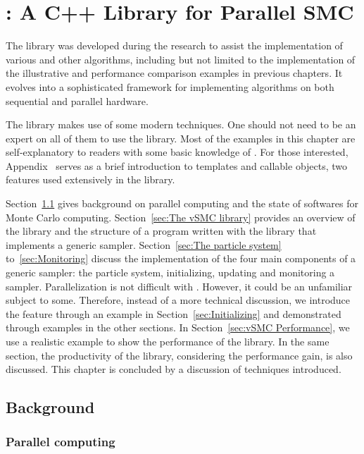 \chapter[vSMC: A C++ Library for Parallel SMC]{\protect\vsmc: A C++ Library for Parallel SMC}
\label{cha:vSMC: A C++ Library for Parallel SMC}

The \vsmc library was developed during the research to assist the implementation of various \smc and other algorithms, including but not limited to the implementation of the illustrative and performance comparison examples in previous chapters. It evolves into a sophisticated \cpp framework for implementing \smc algorithms on both sequential and parallel hardware.

The library makes use of some modern \cpp techniques. One should not need to be an expert on all of them to use the library. Most of the examples in this chapter are self-explanatory to readers with some basic knowledge of \cpp. For those interested, Appendix~ serves as a brief introduction to \cpp templates and callable objects, two features used extensively in the \vsmc library.

Section~\ref{sec:vSMC Background} gives background on parallel computing and the state of softwares for Monte Carlo computing. Section~\ref{sec:The vSMC library} provides an overview of the library and the structure of a program written with the library that implements a generic \smc sampler. Section~\ref{sec:The particle system} to~\ref{sec:Monitoring} discuss the implementation of the four main components of a generic \smc sampler: the particle system, initializing, updating and monitoring a sampler. Parallelization is not difficult with \vsmc. However, it could be an unfamiliar subject to some. Therefore, instead of a more technical discussion, we introduce the feature through an example in Section~\ref{sec:Initializing} and demonstrated through examples in the other sections. In Section~\ref{sec:vSMC Performance}, we use a realistic example to show the performance of the library. In the same section, the productivity of the library, considering the performance gain, is also discussed. This chapter is concluded by a discussion of techniques introduced.

\section{Background}
\label{sec:vSMC Background}

\subsection{Parallel computing}
\label{sub:Parallel computing}


